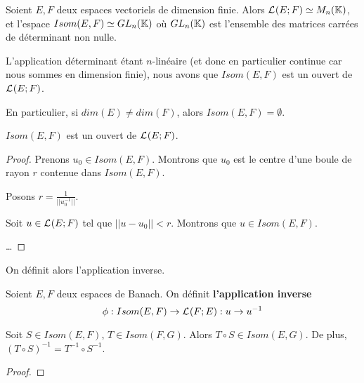 \begin{remarque}
	Soient $E, F$ deux espaces vectoriels de dimension finie. Alors
	$\mathcal{L}_{}(E; F) \simeq M_{n}(\mathbb{K})$, et l'espace
	$Isom(E, F) \simeq GL_{n}(\mathbb{K})$ où
	$GL_{n}(\mathbb{K})$ est l'ensemble des matrices carrées
	de déterminant non nulle.

	L'application déterminant étant $n$-linéaire (et donc en particulier
	continue car nous sommes en dimension finie), nous avons que $Isom(E, F)$
	est un ouvert de $\mathcal{L}_{}(E; F)$.

	En particulier, si $dim(E) \neq dim(F)$, alors $Isom(E, F) = \emptyset$.
\end{remarque}

\begin{proposition}
	$Isom(E, F)$ est un ouvert de $\mathcal{L}_{}(E; F)$.
\end{proposition}

\ifdefined\outputproof
\begin{proof}
	Prenons $u_{0} \in Isom(E, F)$. Montrons que $u_{0}$ est le centre d'une
	boule de rayon $r$ contenue dans $Isom(E, F)$.

	Posons $r = \frac{1}{||u_{0}^{-1}||}$.

	Soit $u \in \mathcal{L}_{}(E; F)$ tel que $||u - u_{0}|| < r$. Montrons
	que $u \in Isom(E, F)$.

	\ldots
\end{proof}
\fi

On définit alors l'application inverse.

\begin{definition}
	Soient $E, F$ deux espaces de Banach. On définit \textbf{l'application
	inverse}
	\begin{equation*}
		\phi : Isom(E, F) \rightarrow \mathcal{L}_{}(F; E) : u \rightarrow u^{-1}
	\end{equation*}
\end{definition}

\begin{proposition}
	Soit $S \in Isom(E, F)$, $T \in Isom(F, G)$.
	Alors $T \circ S \in Isom(E, G)$. De plus, $(T \circ S)^{-1} = T^{-1} \circ
	S^{-1}$.
\end{proposition}

\ifdefined\outputproof
\begin{proof}

\end{proof}
\fi

